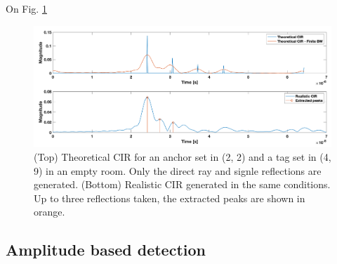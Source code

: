 On Fig. \ref{fig:cir_4_9}

\begin{figure}
\centering
\includegraphics[width=.9\linewidth]{Images/hla_images/cir_4_9.png}
\caption{(Top) Theoretical CIR for an anchor set in (2, 2) and a tag set in (4, 9) in an empty room. Only the direct ray and signle reflections are generated. (Bottom) Realistic CIR generated in the same conditions. Up to three reflections taken, the extracted peaks are shown in orange.\label{fig:cir_4_9}}
\end{figure}

\subsection{Amplitude based detection}


